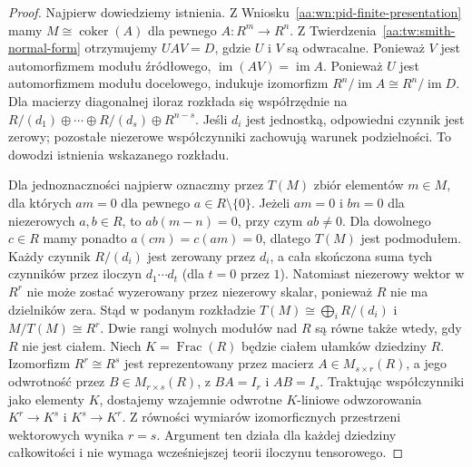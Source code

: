 \begin{proof}
Najpierw dowiedziemy istnienia. Z
Wniosku~\ref{aa:wn:pid-finite-presentation} mamy
$M\cong\operatorname{coker}(A)$ dla pewnego
$A:R^m\to R^n$. Z Twierdzenia~\ref{aa:tw:smith-normal-form}
otrzymujemy $UAV=D$, gdzie $U$ i $V$ są odwracalne.
Ponieważ $V$ jest automorfizmem modułu źródłowego,
$\operatorname{im}(AV)=\operatorname{im}A$.
Ponieważ $U$ jest automorfizmem modułu docelowego,
indukuje izomorfizm $R^n/\operatorname{im}A\cong
R^n/\operatorname{im}D$. Dla macierzy diagonalnej
iloraz rozkłada się współrzędnie na
$R/(d_1)\oplus\cdots\oplus R/(d_s)\oplus R^{n-s}$.
Jeśli $d_i$ jest jednostką, odpowiedni czynnik jest zerowy;
pozostałe niezerowe współczynniki zachowują warunek
podzielności. To dowodzi istnienia wskazanego rozkładu.

Dla jednoznaczności najpierw oznaczmy przez $T(M)$ zbiór
elementów $m\in M$, dla których $am=0$ dla pewnego
$a\in R\setminus\{0\}$. Jeżeli $am=0$ i $bn=0$ dla niezerowych $a,b\in R$,
to $ab(m-n)=0$, przy czym $ab\ne0$. Dla dowolnego
$c\in R$ mamy ponadto $a(cm)=c(am)=0$, dlatego
$T(M)$ jest podmodułem. Każdy czynnik $R/(d_i)$
jest zerowany przez $d_i$, a cała skończona suma tych
czynników przez iloczyn $d_1\cdots d_t$ (dla $t=0$
przez $1$). Natomiast niezerowy wektor w $R^r$ nie
może zostać wyzerowany przez niezerowy skalar, ponieważ
$R$ nie ma dzielników zera. Stąd w podanym rozkładzie
$T(M)\cong\bigoplus_i R/(d_i)$ i $M/T(M)\cong R^r$.
Dwie rangi wolnych modułów nad $R$ są równe także wtedy,
gdy $R$ nie jest ciałem. Niech $K=\operatorname{Frac}(R)$
będzie ciałem ułamków dziedziny $R$. Izomorfizm
$R^r\cong R^s$ jest reprezentowany przez macierz
$A\in M_{s\times r}(R)$, a jego odwrotność przez
$B\in M_{r\times s}(R)$, z $BA=I_r$ i $AB=I_s$.
Traktując współczynniki jako elementy $K$, dostajemy
wzajemnie odwrotne $K$-liniowe odwzorowania
$K^r\to K^s$ i $K^s\to K^r$. Z równości
wymiarów izomorficznych przestrzeni wektorowych
wynika $r=s$. Argument ten działa dla każdej
dziedziny całkowitości i nie wymaga wcześniejszej
teorii iloczynu tensorowego.


\end{proof}

